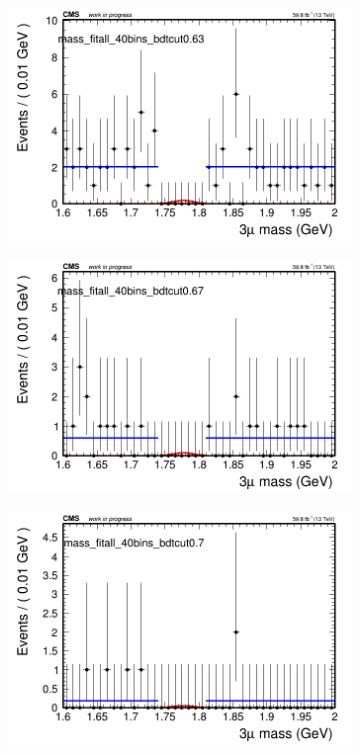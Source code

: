\begin{figure}[H]
\begin{subfigure}{0.2\textwidth}
        \caption{}
    \end{subfigure}
    \begin{subfigure}{0.2\textwidth}
        \includegraphics[width=\textwidth]{flat_fit/plots/all/massfit_all_40bins_bdtcut0.63.png}
        \caption{}
    \end{subfigure}
    \begin{subfigure}{0.2\textwidth}
        \includegraphics[width=\textwidth]{flat_fit/plots/all/massfit_all_40bins_bdtcut0.67.png}
        \caption{}
    \end{subfigure}
    \begin{subfigure}{0.2\textwidth}
        \includegraphics[width=\textwidth]{flat_fit/plots/all/massfit_all_40bins_bdtcut0.7.png}

\end{subfigure}
\end{figure}
